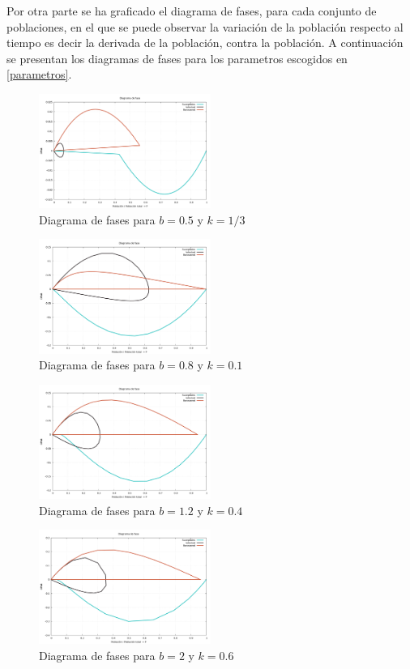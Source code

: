 \documentclass[journal]{IEEEtran}
\begin{document}
Por otra parte se ha graficado el diagrama de fases, para cada conjunto de poblaciones, en el que se puede observar 
la variación de la población respecto al tiempo es decir la derivada de la población, contra la población. A continuación se presentan los diagramas de fases para
los parametros escogidos en \ref{parametros}.
\begin{figure}[H]
	\centering
	\includegraphics[width=0.5\textwidth]{SIR/phase-1-SIR}
	\caption{Diagrama de fases para $b=0.5$ y $k=1/3$}
	\label{diagrama-fases}
\end{figure}
\begin{figure}[H]
	\centering
	\includegraphics[width=0.5\textwidth]{SIR/phase-2-SIR}
	\caption{Diagrama de fases para $b=0.8$ y $k=0.1$}
	\label{diagrama-fases}
\end{figure}\begin{figure}[H]
	\centering
	\includegraphics[width=0.5\textwidth]{SIR/phase-3-SIR}
	\caption{Diagrama de fases para $b=1.2$ y $k=0.4$}
	\label{diagrama-fases}
\end{figure}\begin{figure}[H]
	\centering
	\includegraphics[width=0.5\textwidth]{SIR/phase-4-SIR}
	\caption{Diagrama de fases para $b=2$ y $k=0.6$}
	\label{diagrama-fases}
\end{figure}
	
\end{document}
